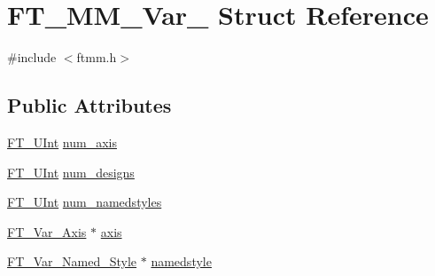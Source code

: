 \hypertarget{struct_f_t___m_m___var__}{\section{F\-T\-\_\-\-M\-M\-\_\-\-Var\-\_\- Struct Reference}
\label{struct_f_t___m_m___var__}
}


{\ttfamily \#include $<$ftmm.\-h$>$}

\subsection*{Public Attributes}
\begin{DoxyCompactItemize}
\item 
\hyperlink{fttypes_8h_abcb8db4dbf35d2b55a9e8c7b0926dc52}{F\-T\-\_\-\-U\-Int} \hyperlink{struct_f_t___m_m___var___acd32d4eb128f6fd9f6fde7da4c7b99bf}{num\-\_\-axis}
\item 
\hyperlink{fttypes_8h_abcb8db4dbf35d2b55a9e8c7b0926dc52}{F\-T\-\_\-\-U\-Int} \hyperlink{struct_f_t___m_m___var___a5109a6a20626d90ed44cd64363d29e92}{num\-\_\-designs}
\item 
\hyperlink{fttypes_8h_abcb8db4dbf35d2b55a9e8c7b0926dc52}{F\-T\-\_\-\-U\-Int} \hyperlink{struct_f_t___m_m___var___ac54bdd53447f4967b5d3b1a341a4bdff}{num\-\_\-namedstyles}
\item 
\hyperlink{ftmm_8h_a8b0e5ef119b710a0a4e09c759effe038}{F\-T\-\_\-\-Var\-\_\-\-Axis} $\ast$ \hyperlink{struct_f_t___m_m___var___a19cc7772e057dad1c4acd6e744328466}{axis}
\item 
\hyperlink{ftmm_8h_a0e14db2af2621f16b9446ce0dd7734a1}{F\-T\-\_\-\-Var\-\_\-\-Named\-\_\-\-Style} $\ast$ \hyperlink{struct_f_t___m_m___var___acda1ec5211250ddc06ec090f695adabf}{namedstyle}
\end{DoxyCompactItemize}


